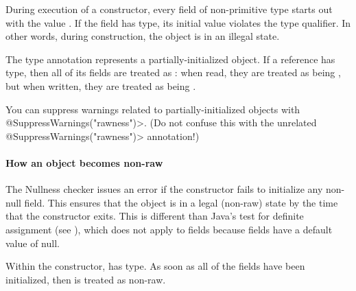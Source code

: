 During execution of a constructor, every field of non-primitive type starts
out with the value .  If the field has
 type, its initial value 
violates the  type qualifier.  In other words, during
construction, the object is in an illegal state.


The  type annotation represents a
partially-initialized object.  If a reference has
 type, then all of its fields are treated as
:  when read, they are
treated as being , but when
written, they are treated as being
.




You can suppress warnings related to partially-initialized objects with
\<@SuppressWarnings("rawness")>.  (Do not confuse this with the unrelated
\<@SuppressWarnings("rawness")> annotation!)


\paragraph{How an object becomes non-raw}

The Nullness checker issues an error if the constructor fails to initialize
any non-null field.  This ensures that the object is in a legal (non-raw)
state by the time that the constructor exits.
This is different than Java's test for definite assignment  (see 
),
which does not apply to fields because fields have a default value
of null.


Within the constructor,
 has  type.
As soon as all of the  fields
have been initialized, then  is treated as non-raw.

